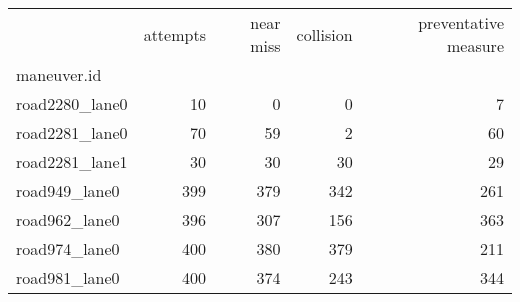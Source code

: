 \begin{tabular}{lrrrr}
\toprule
{} &  attempts &  near miss &  collision &  preventative measure \\
maneuver.id    &           &            &            &                       \\
\midrule
road2280\_lane0 &        10 &          0 &          0 &                     7 \\
road2281\_lane0 &        70 &         59 &          2 &                    60 \\
road2281\_lane1 &        30 &         30 &         30 &                    29 \\
road949\_lane0  &       399 &        379 &        342 &                   261 \\
road962\_lane0  &       396 &        307 &        156 &                   363 \\
road974\_lane0  &       400 &        380 &        379 &                   211 \\
road981\_lane0  &       400 &        374 &        243 &                   344 \\
\bottomrule
\end{tabular}
